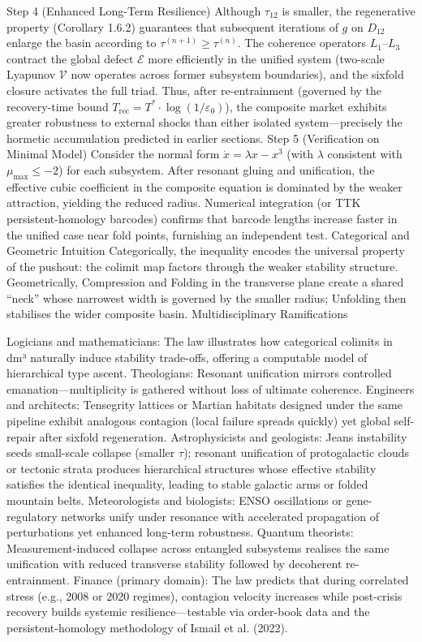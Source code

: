 Step 4 (Enhanced Long-Term Resilience)
Although $  \tau_{12}  $ is smaller, the regenerative property (Corollary 1.6.2) guarantees that subsequent iterations of $  g  $ on $  D_{12}  $ enlarge the basin according to $  \tau^{(n+1)} \ge \tau^{(n)}  $. The coherence operators $  L_1  $–$  L_3  $ contract the global defect $  \mathcal{E}  $ more efficiently in the unified system (two-scale Lyapunov $  \mathcal{V}  $ now operates across former subsystem boundaries), and the sixfold closure activates the full triad. Thus, after re-entrainment (governed by the recovery-time bound $  T_{\text{rec}} = T^* \cdot \log(1/\varepsilon_0)  $), the composite market exhibits greater robustness to external shocks than either isolated system—precisely the hormetic accumulation predicted in earlier sections.
Step 5 (Verification on Minimal Model)
Consider the normal form $  \dot{x} = \lambda x - x^3  $ (with $  \lambda  $ consistent with $  \mu_{\max} \le -2  $) for each subsystem. After resonant gluing and unification, the effective cubic coefficient in the composite equation is dominated by the weaker attraction, yielding the reduced radius. Numerical integration (or TTK persistent-homology barcodes) confirms that barcode lengths increase faster in the unified case near fold points, furnishing an independent test.
Categorical and Geometric Intuition
Categorically, the inequality encodes the universal property of the pushout: the colimit map factors through the weaker stability structure. Geometrically, Compression and Folding in the transverse plane create a shared “neck” whose narrowest width is governed by the smaller radius; Unfolding then stabilises the wider composite basin.
Multidisciplinary Ramifications

Logicians and mathematicians: The law illustrates how categorical colimits in dm³ naturally induce stability trade-offs, offering a computable model of hierarchical type ascent.
Theologians: Resonant unification mirrors controlled emanation—multiplicity is gathered without loss of ultimate coherence.
Engineers and architects: Tensegrity lattices or Martian habitats designed under the same pipeline exhibit analogous contagion (local failure spreads quickly) yet global self-repair after sixfold regeneration.
Astrophysicists and geologists: Jeans instability seeds small-scale collapse (smaller $  \tau  $); resonant unification of protogalactic clouds or tectonic strata produces hierarchical structures whose effective stability satisfies the identical inequality, leading to stable galactic arms or folded mountain belts.
Meteorologists and biologists: ENSO oscillations or gene-regulatory networks unify under resonance with accelerated propagation of perturbations yet enhanced long-term robustness.
Quantum theorists: Measurement-induced collapse across entangled subsystems realises the same unification with reduced transverse stability followed by decoherent re-entrainment.
Finance (primary domain): The law predicts that during correlated stress (e.g., 2008 or 2020 regimes), contagion velocity increases while post-crisis recovery builds systemic resilience—testable via order-book data and the persistent-homology methodology of Ismail et al. (2022).

